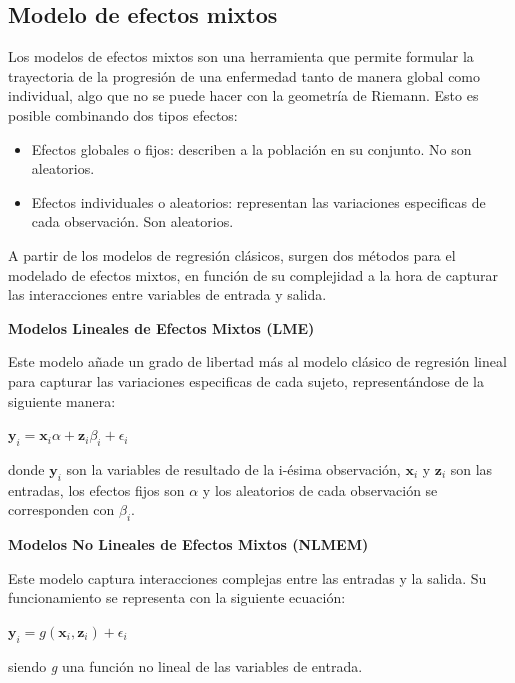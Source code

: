 \documentclass[12pt]{article}
\begin{document}
\subsection{Modelo de efectos mixtos}
Los modelos de efectos mixtos son una herramienta que permite formular la trayectoria de la progresión de una enfermedad tanto de manera global como individual, algo que no se puede hacer con la geometría de Riemann. Esto es posible combinando dos tipos efectos:
\begin{itemize}
	\item Efectos globales o fijos: describen a la población en su conjunto. No son aleatorios.
	\item Efectos individuales o aleatorios: representan las variaciones especificas de cada observación. Son aleatorios.
\end{itemize}

A partir de los modelos de regresión clásicos, surgen dos métodos para el modelado de efectos mixtos, en función de su complejidad a la hora de capturar las interacciones entre variables de entrada y salida.


\begin{description}
	\item {\textbf{Modelos Lineales de Efectos Mixtos (LME)}}

Este modelo añade un grado de libertad más al modelo clásico de regresión lineal para capturar las variaciones especificas de cada sujeto, representándose de la siguiente manera:\\
\begin{center}
	$\textbf{y}_{i}=\textbf{x}_{i}\alpha+\textbf{z}_{i}\beta_{i}+\epsilon_{i}$
\end{center}
donde $\textbf{y}_{i}$ son la variables de resultado de la i-ésima observación, $\textbf{x}_{i}$ y $\textbf{z}_{i}$ son las entradas, los efectos fijos son $\alpha$ y los aleatorios de cada observación se corresponden con $\beta_{i}$.

	\item{\textbf{Modelos No Lineales de Efectos Mixtos (NLMEM)}}
	
Este modelo captura interacciones complejas entre las entradas y la salida. Su funcionamiento se representa con la siguiente ecuación:
\begin{center}
	$\textbf{y}_{i}=g(\textbf{x}_{i},\textbf{z}_{i})+\epsilon_{i}$
\end{center}
siendo \textit{g} una función no lineal de las variables de entrada.
\end{description}
\end{document}
